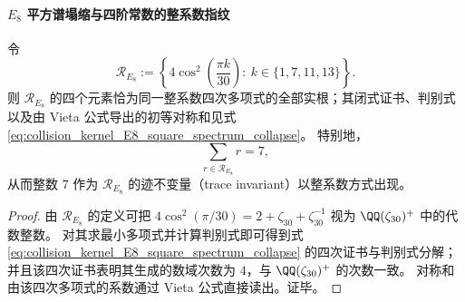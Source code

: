 
\paragraph{\texorpdfstring{$E_8$}{E8} 平方谱塌缩与四阶常数的整系数指纹}\label{para:pom-s4-e8-square-spectrum-collapse}

\begin{proposition}\label{prop:pom-e8-square-spectrum-collapse-trace7}
令
\[
\mathcal R_{E_8}:=\left\{4\cos^2\!\left(\frac{\pi k}{30}\right):\ k\in\{1,7,11,13\}\right\}.
\]
则 \(\mathcal R_{E_8}\) 的四个元素恰为同一整系数四次多项式的全部实根；其闭式证书、判别式以及由 Vieta 公式导出的初等对称和见式 \eqref{eq:collision_kernel_E8_square_spectrum_collapse}。
特别地，
\[
\sum_{r\in\mathcal R_{E_8}}r=7,
\]
从而整数 \(7\) 作为 \(\mathcal R_{E_8}\) 的迹不变量（trace invariant）以整系数方式出现。
\end{proposition}
\begin{proof}
由 \(\mathcal R_{E_8}\) 的定义可把 \(4\cos^2(\pi/30)=2+\zeta_{30}+\zeta_{30}^{-1}\) 视为 \(\QQ(\zeta_{30})^+\) 中的代数整数。
对其求最小多项式并计算判别式即可得到式 \eqref{eq:collision_kernel_E8_square_spectrum_collapse} 的四次证书与判别式分解；并且该四次证书表明其生成的数域次数为 \(4\)，与 \(\QQ(\zeta_{30})^+\) 的次数一致。
对称和由该四次多项式的系数通过 Vieta 公式直接读出。证毕。
\end{proof}

